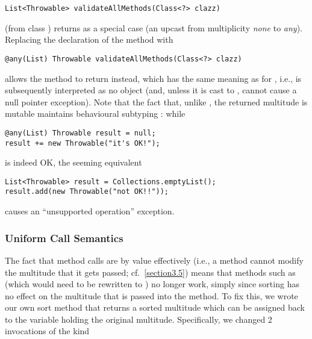 {\begin{lstlisting}
List<Throwable> validateAllMethods(Class<?> clazz)
\end{lstlisting}

\noindent (from class ) returns
 as a special case (an upcast from
multiplicity \emph{none} to \emph{any}). Replacing the declaration
of the method with

\begin{lstlisting}
@any(List) Throwable validateAllMethods(Class<?> clazz)
\end{lstlisting}

\noindent allows the method to return  instead, which has the same
meaning as  for , i.e., is subsequently
interpreted as no object (and, unless it is cast to , cannot
cause a null pointer exception). Note that the fact that, unlike
\discretionary{}{}{}, the returned multitude is mutable maintains
behavioural subtyping \cite{ref22}: while

\begin{lstlisting}
@any(List) Throwable result = null;
result += new Throwable("it's OK!");
\end{lstlisting}

\noindent is indeed OK, the seeming equivalent

\begin{lstlisting}
List<Throwable> result = Collections.emptyList();
result.add(new Throwable("not OK!!"));
\end{lstlisting}

\noindent causes an ``unsupported operation'' exception.

\subsubsection{Uniform Call Semantics}
\label{section6.1.6}

\noindent The fact that method calls are by value effectively (i.e., a
method cannot modify the multitude that it gets passed; cf.~\autoref{section3.5})
means that methods such as  (which
would need to be rewritten to  \discretionary{}{}{}) no
longer work, simply since sorting has no effect on the multitude that is
passed into the method. To fix this, we wrote our own sort method that
returns a sorted multitude which can be assigned back to the variable
holding the original multitude. Specifically, we changed 2 invocations of
the kind

}
